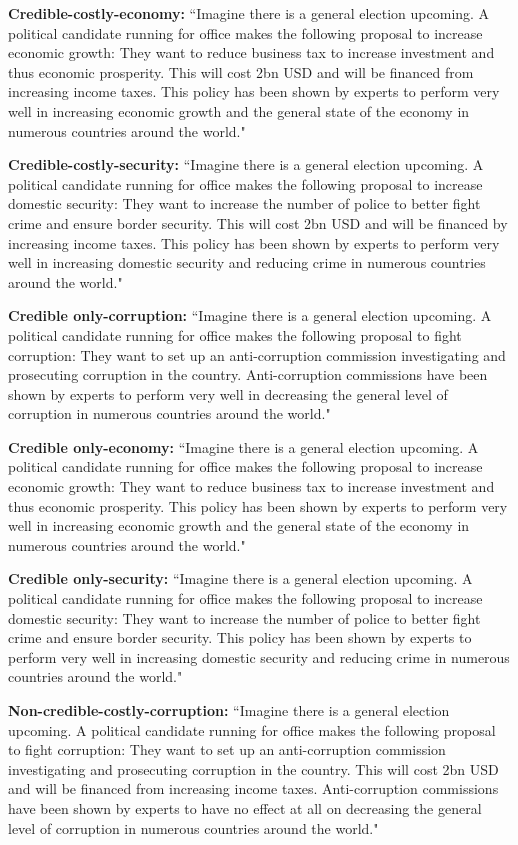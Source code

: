 \documentclass[11pt]{article}
\begin{document}
\textbf{Credible-costly-economy:}
“Imagine there is a general election upcoming. A political candidate running for office makes the following proposal to increase economic growth: They want to reduce business tax to increase investment and thus economic prosperity. This will cost 2bn USD and will be financed from increasing income taxes. This policy has been shown by experts to perform very well in increasing economic growth and the general state of the economy in numerous countries around the world."

\textbf{Credible-costly-security:}
“Imagine there is a general election upcoming. A political candidate running for office makes the following proposal to increase domestic security: They want to increase the number of police to better fight crime and ensure border security. This will cost 2bn USD and will be financed by increasing income taxes. This policy has been shown by experts to perform very well in increasing domestic security and reducing crime in numerous countries around the world."


\textbf{Credible only-corruption:}
“Imagine there is a general election upcoming. A political candidate running for office makes the following proposal to fight corruption: They want to set up an anti-corruption commission investigating and prosecuting corruption in the country. Anti-corruption commissions have been shown by experts to perform very well in decreasing the general level of corruption in numerous countries around the world."

\textbf{Credible only-economy:}
“Imagine there is a general election upcoming. A political candidate running for office makes the following proposal to increase economic growth: They want to reduce business tax to increase investment and thus economic prosperity. This policy has been shown by experts to perform very well in increasing economic growth and the general state of the economy in numerous countries around the world."

\textbf{Credible only-security:}
“Imagine there is a general election upcoming. A political candidate running for office makes the following proposal to increase domestic security: They want to increase the number of police to better fight crime and ensure border security. This policy has been shown by experts to perform very well in increasing domestic security and reducing crime in numerous countries around the world."

\textbf{Non-credible-costly-corruption:}
“Imagine there is a general election upcoming. A political candidate running for office makes the following proposal to fight corruption: They want to set up an anti-corruption commission investigating and prosecuting corruption in the country. This will cost 2bn USD and will be financed from increasing income taxes. Anti-corruption commissions have been shown by experts to have no effect at all on decreasing the general level of corruption in numerous countries around the world."
\end{document}
